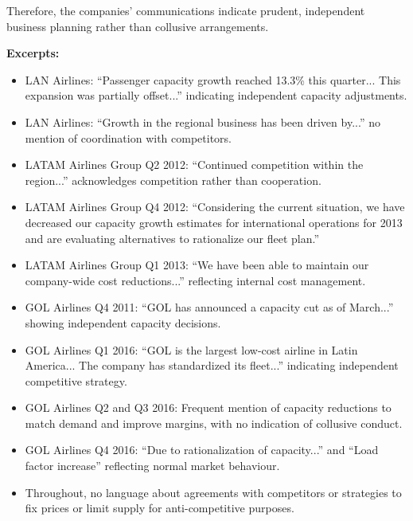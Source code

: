 \documentclass[12pt]{article}
\begin{document}
Therefore, the companies' communications indicate prudent, independent business planning rather than collusive arrangements.

\textbf{Excerpts:}
\begin{itemize}
\item LAN Airlines: ``Passenger capacity growth reached 13.3\% this quarter... This expansion was partially offset...'' indicating independent capacity adjustments.
\item LAN Airlines: ``Growth in the regional business has been driven by...'' no mention of coordination with competitors.
\item LATAM Airlines Group Q2 2012: ``Continued competition within the region...'' acknowledges competition rather than cooperation.
\item LATAM Airlines Group Q4 2012: ``Considering the current situation, we have decreased our capacity growth estimates for international operations for 2013 and are evaluating alternatives to rationalize our fleet plan.''
\item LATAM Airlines Group Q1 2013: ``We have been able to maintain our company-wide cost reductions...'' reflecting internal cost management.
\item GOL Airlines Q4 2011: ``GOL has announced a capacity cut as of March...'' showing independent capacity decisions.
\item GOL Airlines Q1 2016: ``GOL is the largest low-cost airline in Latin America... The company has standardized its fleet...'' indicating independent competitive strategy.
\item GOL Airlines Q2 and Q3 2016: Frequent mention of capacity reductions to match demand and improve margins, with no indication of collusive conduct.
\item GOL Airlines Q4 2016: ``Due to rationalization of capacity...'' and ``Load factor increase'' reflecting normal market behaviour.
\item Throughout, no language about agreements with competitors or strategies to fix prices or limit supply for anti-competitive purposes.
\end{itemize}
\end{document}
